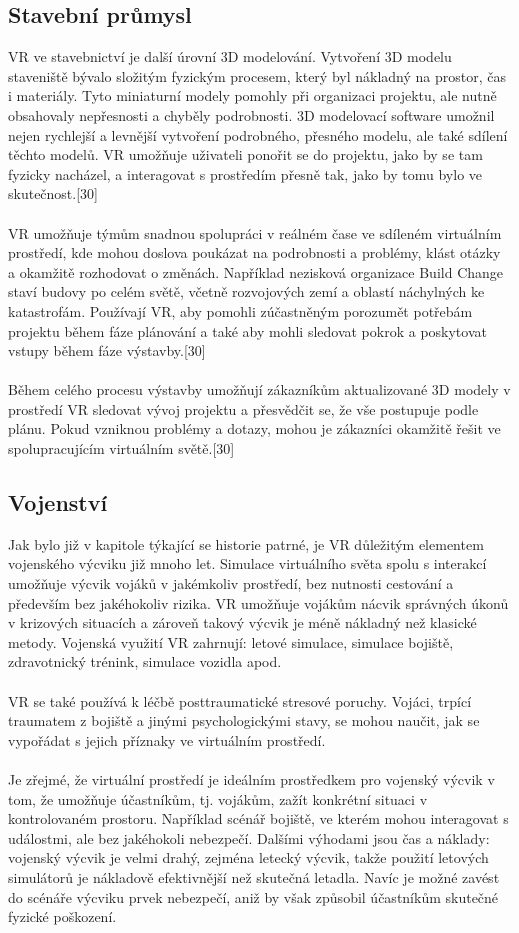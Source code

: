 \documentclass[a4paper, 12pt]{report}
\begin{document}
\subsection{Stavební průmysl}
VR ve stavebnictví je další úrovní 3D modelování. Vytvoření 3D modelu staveniště bývalo složitým fyzickým procesem, který byl nákladný na prostor, čas i materiály. Tyto miniaturní modely pomohly při organizaci projektu, ale nutně obsahovaly nepřesnosti a chyběly podrobnosti. 3D modelovací software umožnil nejen rychlejší a levnější vytvoření podrobného, přesného modelu, ale také sdílení těchto modelů. VR umožňuje uživateli ponořit se do projektu, jako by se tam fyzicky nacházel, a interagovat s prostředím přesně tak, jako by tomu bylo ve skutečnost.[30]\\
\\
VR umožňuje týmům snadnou spolupráci v reálném čase ve sdíleném virtuálním prostředí, kde mohou doslova poukázat na podrobnosti a problémy, klást otázky a okamžitě rozhodovat o změnách. Například nezisková organizace Build Change staví budovy po celém světě, včetně rozvojových zemí a oblastí náchylných ke katastrofám. Používají VR, aby pomohli zúčastněným porozumět potřebám projektu během fáze plánování a také aby mohli sledovat pokrok a poskytovat vstupy během fáze výstavby.[30]\\
\\
Během celého procesu výstavby umožňují zákazníkům aktualizované 3D modely v prostředí VR sledovat vývoj projektu a přesvědčit se, že vše postupuje podle plánu. Pokud vzniknou problémy a dotazy, mohou je zákazníci okamžitě řešit ve spolupracujícím virtuálním světě.[30]

\subsection{Vojenství}
Jak bylo již v kapitole týkající se historie patrné, je VR důležitým elementem vojenského výcviku již mnoho let. Simulace virtuálního světa spolu s interakcí umožňuje výcvik vojáků v jakémkoliv prostředí, bez nutnosti cestování a především bez jakéhokoliv rizika. VR umožňuje vojákům nácvik správných úkonů v krizových situacích a zároveň takový výcvik je méně nákladný než klasické metody. Vojenská využití VR zahrnují: letové simulace, simulace bojiště, zdravotnický trénink, simulace vozidla apod.\\
\\
VR se také používá k léčbě posttraumatické stresové poruchy. Vojáci, trpící traumatem z bojiště a jinými psychologickými stavy, se mohou naučit, jak se vypořádat s jejich příznaky ve virtuálním prostředí.\\
\\
Je zřejmé, že virtuální prostředí je ideálním prostředkem pro vojenský výcvik v tom, že umožňuje účastníkům, tj. vojákům, zažít konkrétní situaci v kontrolovaném prostoru. Například scénář bojiště, ve kterém mohou interagovat s událostmi, ale bez jakéhokoli nebezpečí. Dalšími výhodami jsou čas a náklady: vojenský výcvik je velmi drahý, zejména letecký výcvik, takže použití letových simulátorů je nákladově efektivnější než skutečná letadla. Navíc je možné zavést do scénáře výcviku prvek nebezpečí, aniž by však způsobil účastníkům skutečné fyzické poškození.
\end{document}

